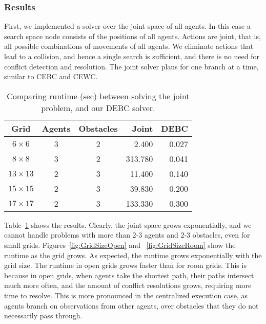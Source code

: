 \documentclass[letterpaper]{article} %
\begin{document}
\subsubsection{Results}
First, we implemented a solver over the joint space of all agents. In this case a search space node consists of the positions of all agents. Actions are joint, that is, all possible combinations of movements of all agents. We eliminate actions that lead to a collision, and hence a single search is sufficient, and there is no need for conflict detection and resolution. The joint solver plans for one branch at a time, similar to CEBC and CEWC.
\begin{table}[t]
\centering
\scriptsize
\begin{tabular}{| c | c | c | r | r |}
\hline
Grid & Agents & Obstacles & Joint & DEBC \\ \hline
$6 \times 6$ & 3   & 2 & 2.400 & 0.027 \\ \hline
$8 \times 8$ & 3   & 2 & 313.780 & 0.041 \\ \hline
$13 \times 13$ & 2   & 3 & 11.400 & 0.140 \\ \hline
$15 \times 15$ & 2   & 3 & 39.830 & 0.200 \\ \hline
$17 \times 17$ & 2   & 3 & 133.330 & 0.300 \\ \hline
\end{tabular}
\caption{Comparing runtime (sec) between solving the joint problem, and our DEBC solver.}
\label{tbl:joint}
\end{table}
Table~\ref{tbl:joint} shows the results. Clearly, the joint space grows exponentially, and we cannot handle problems with more than 2-3 agents and 2-3 obstacles, even for small grids.
Figures~\ref{fig:GridSizeOpen} and ~\ref{fig:GridSizeRoom} show the runtime as the grid grows. As expected, the runtime grows exponentially with the grid size. The runtime in open grids grows faster than for room grids. This is because in open grids, when agents take the shortest path, their paths intersect much more often, and the amount of conflict resolutions grows, requiring more time to resolve. This is more pronounced in the centralized execution case, as agents branch on observations from other agents, over obstacles that they do not necessarily pass through.
\end{document}
